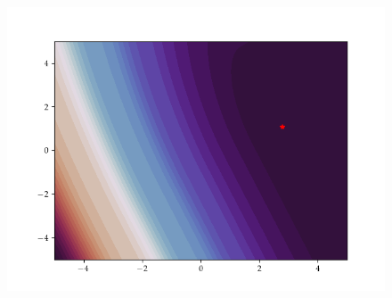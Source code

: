 \begin{figure}[h]
\begin{minipage}[b]{0.32\textwidth}
      \includegraphics[trim=2.5cm 1.3cm 2.5cm 1.3cm,clip,width=\textwidth]{Figures/coco/f6.png}
    \end{minipage}
    


\end{figure}
